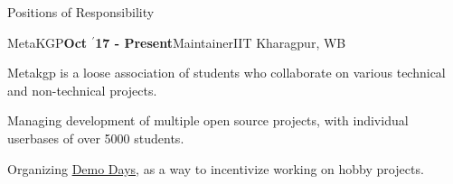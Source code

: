 \documentclass{resume} %
\begin{document}
\begin{rSection}{Positions of Responsibility}

\begin{rSubsection}{\large MetaKGP}{\textbf{\large Oct $^{\prime}$17 - Present}}{Maintainer}{IIT Kharagpur, WB}
\item Metakgp is a loose association of students who collaborate on various technical and non-technical projects.
\item Managing development of multiple open source projects, with individual userbases of over 5000 students.
\item Organizing \href{https://www.youtube.com/watch?v=srH_yJJFK80&list=PLxBVN59ffbfKmADdIpkNCs4jfxJ-Nyhqx}{Demo Days}, as a way to incentivize working on hobby projects.
\end{rSubsection}





\end{rSection}
\end{document}
